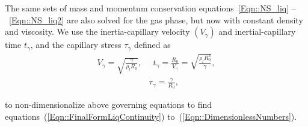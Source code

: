 \documentclass[final]{jfm}
\begin{document}
The same sets of mass and momentum conservation equations~\ref{Eqn::NS_liq} --~\ref{Eqn::NS_liq2} are also solved for the gas phase, but now with constant density and viscosity. We use the inertia-capillary velocity $\left(V_\gamma\right)$ and inertial-capillary time $t_\gamma$, and the capillary stress $\tau_\gamma$ defined as
\begin{align}\label{Eqn::Scales1}
	V_\gamma = \sqrt{\frac{\gamma}{\rho_lR_0}},&\,\,\,t_\gamma = \frac{R_0}{V_\gamma} = \sqrt{\frac{\rho_lR_0^3}{\gamma}},\\
	\label{Eqn::Scales2}
	&\tau_\gamma = \frac{\gamma}{R_0},
\end{align}

\noindent to non-dimensionalize above governing equations to find equations~(\ref{Eqn::FinalFormLiqContinuity}) to~(\ref{Eqn::DimensionlessNumbers}).
\end{document}
